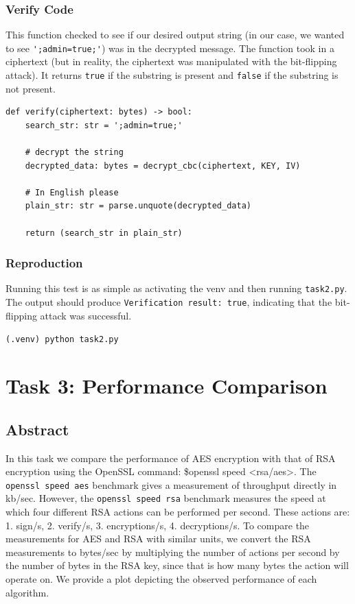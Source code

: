\documentclass[11pt]{article}
\begin{document}
\subsubsection*{Verify Code}

This function checked to see if our desired output string (in our case, we wanted to see \verb|';admin=true;'|) was in the decrypted message. The function took in a ciphertext (but in reality, the ciphertext was manipulated with the bit-flipping attack). It returns \verb|true| if the substring is present and \verb|false| if the substring is not present.

\begin{framed}
\begin{verbatim}
def verify(ciphertext: bytes) -> bool:
    search_str: str = ';admin=true;'

    # decrypt the string  
    decrypted_data: bytes = decrypt_cbc(ciphertext, KEY, IV)

    # In English please
    plain_str: str = parse.unquote(decrypted_data)

    return (search_str in plain_str)

\end{verbatim}
\end{framed}

\subsubsection*{Reproduction}

Running this test is as simple as activating the venv and then running \verb|task2.py|. The output should produce \verb|Verification result: true|, indicating that the bit-flipping attack was successful.

\verb|(.venv) python task2.py|

\section*{Task 3: Performance Comparison}
\subsection*{Abstract}

In this task we compare the performance of AES encryption with that of RSA encryption using the OpenSSL command: \$openssl speed <rsa/aes>. The \verb|openssl speed aes| benchmark gives a measurement of throughput directly in kb/sec. However, the \verb|openssl speed rsa| benchmark measures the speed at which four different RSA actions can be performed per second. These actions are: 1. sign/s, 2. verify/s, 3. encryptions/s, 4. decryptions/s. To compare the measurements for AES and RSA with similar units, we convert the RSA measurements to bytes/sec by multiplying the number of actions per second by the number of bytes in the RSA key, since that is how many bytes the action will operate on. We provide a plot depicting the observed performance of each algorithm.
\end{document}
